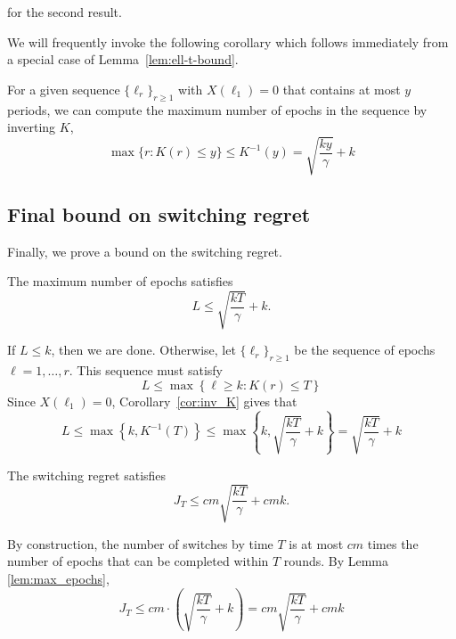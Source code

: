 \documentclass[opre,blindrev]{informs3}
\begin{document}
\begin{APPENDICES}
    for the second result.
\Halmos

We will frequently invoke the following corollary which follows immediately from  a special case of Lemma~\ref{lem:ell-t-bound}. 
\begin{corollary}[Inverse of \(K(r)\) with \(X(\ell_1)=0\)]\label{cor:inv_K}
    For a given sequence \(\{\ell_r\}_{r\geq 1}\) with \(X(\ell_1)=0\) that contains at most \(y\) periods, we can compute the maximum number of epochs in the sequence by inverting \(K\),
    \[\max\{r: K(r)\leq y\}\leq K^{-1}(y)=\sqrt{\frac{ky}{\gamma }}+k\]
\end{corollary}
%  

\subsection{Final bound on switching regret}
Finally, we prove a bound on the switching regret.
\begin{lemma}\label{lem:max_epochs}
    The maximum number of epochs satisfies
    \[
        L \leq \sqrt{\frac{kT}{\gamma}}+k.
    \]
\end{lemma}
    If \(L\leq k\), then we are done. Otherwise, let \(\{\ell_r\}_{r\geq 1}\) be the sequence of epochs \(\ell=1,\dots,r\). This sequence must satisfy
    \[L \leq \max\left\{\ell\geq k: K(r)\leq T\right\}\]
    Since \(X(\ell_1)=0\), Corollary~\ref{cor:inv_K} gives that
    \[L\leq \max\left\{k, K^{-1}(T)\right\}\leq \max\left\{k, \sqrt{\frac{kT}{\gamma }}+k\right\}= \sqrt{\frac{kT}{\gamma}}+k\]
\Halmos  

\begin{lemma}\label{lem:sc-bound-final}
    The switching regret satisfies
    \[
        J_T \leq cm\sqrt{\frac{kT}{\gamma}}+cmk.
    \]
\end{lemma}
    By construction, the number of switches by time \(T\) is at most \(cm\) times the number of epochs that can be completed within \(T\) rounds. By Lemma \ref{lem:max_epochs},
    \[J_T \leq cm\cdot \left(\sqrt{\frac{kT}{\gamma }}+k\right)=cm\sqrt{\frac{kT}{\gamma}}+cmk\]
\Halmos  


\end{APPENDICES}
\end{document}
